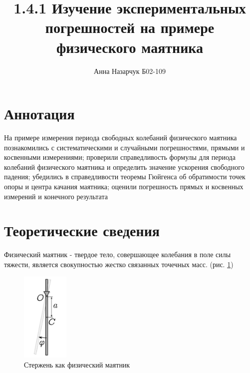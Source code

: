 \documentclass[a4paper,12pt]{article} %
\author{Анна Назарчук Б02-109}
\title{1.4.1 Изучение экспериментальных погрешностей на примере физического маятника}
\date{}
\begin{document}
\maketitle
\section{Аннотация}
На примере измерения периода свободных колебаний физического
маятника познакомились с систематическими и случайными погрешностями, прямыми и косвенными измерениями; проверили справедливость формулы для периода колебаний физического маятника и определить значение ускорения свободного падения; убедились в справедливости теоремы Гюйгенса об обратимости
точек опоры и центра качания маятника; оценили погрешность прямых и косвенных измерений и конечного результата

\section{Теоретические сведения}
Физический маятник - твердое тело, совершающее колебания в поле силы тяжести, является свокупностью жестко связанных точечных масс. (рис. \ref{основа})

\begin{figure}[h!]
\begin{center}
\includegraphics[width=0.2\textwidth]{физмаятник}
\end{center}
\caption{Стержень как физический маятник} \label{основа}
\end{figure}
\end{document}
